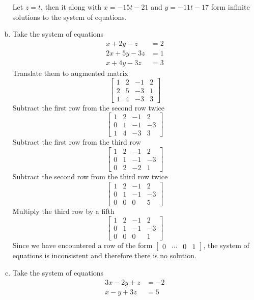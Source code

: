 \documentclass[../main.tex]{subfiles}
\begin{document}
\begin{enumerate}[a)]
		Let $z = t$, then it along with $x = -15t - 21$ and $y = -11t - 17$ form infinite solutions to the system of equations.
	\setcounter{enumi}{3}
	\item 
		Take the system of equations
		\begin{align*}
			x + 2y - z &= 2 \\
			2x + 5y - 3z &= 1 \\
			x + 4y - 3z &= 3
		\end{align*}
		Translate them to augmented matrix
		$$\left[\begin{array}{ccc|c}
			1 & 2 & -1 & 2 \\
			2 & 5 & -3 & 1 \\
			1 & 4 & -3 & 3
		\end{array}\right]$$
		Subtract the first row from the second row twice
		$$\left[\begin{array}{ccc|c}
			1 & 2 & -1 & 2 \\
			0 & 1 & -1 & -3 \\
			1 & 4 & -3 & 3
		\end{array}\right]$$
		Subtract the first row from the third row
		$$\left[\begin{array}{ccc|c}
			1 & 2 & -1 & 2 \\
			0 & 1 & -1 & -3 \\
			0 & 2 & -2 & 1
		\end{array}\right]$$
		Subtract the second row from the third row twice
		$$\left[\begin{array}{ccc|c}
			1 & 2 & -1 & 2 \\
			0 & 1 & -1 & -3 \\
			0 & 0 & 0 & 5
		\end{array}\right]$$
		Multiply the third row by a fifth
		$$\left[\begin{array}{ccc|c}
			1 & 2 & -1 & 2 \\
			0 & 1 & -1 & -3 \\
			0 & 0 & 0 & 1
		\end{array}\right]$$
		Since we have encountered a row of the form $\left[\begin{array}{ccc|c}0&\cdots&0&1\end{array}\right]$, the system of equations is inconsistent and therefore there is no solution.
	\setcounter{enumi}{5}
	\item 
		Take the system of equations
		\begin{align*}
			3x - 2y + z &= -2 \\
			x - y + 3z &= 5 \\

\end{align*}
\end{enumerate}
\end{document}
